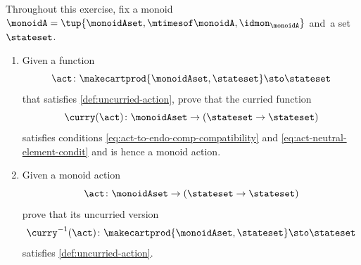 \begin{gradedexercise}
    \label{ex:UncurriedAction}
Throughout this exercise, fix a monoid $\monoidA = \tup{\monoidAset, \mtimesof\monoidA, \idmon_\monoidA}$ and~a set $\stateset$. 
\begin{enumerate}
\item Given a function
    \begin{equation}
    \act \colon \makecartprod{\monoidAset, \stateset} \sto \stateset
    \end{equation}
    that satisfies \cref{def:uncurried-action}, prove that the curried function
    \begin{equation}
    \curry(\act) \colon  \monoidAset \to (\stateset \to \stateset)
    \end{equation}
    satisfies conditions \cref{eq:act-to-endo-comp-compatibility} and \cref{eq:act-neutral-element-condit} and is hence a monoid action. 
    \item Given a monoid action 
    \begin{equation}
    \act \colon  \monoidAset \to (\stateset \to \stateset)
    \end{equation}
    prove that its uncurried version 
    \begin{equation}
    \curry^{-1}(\act) \colon  \makecartprod{\monoidAset, \stateset} \sto \stateset
    \end{equation}
    satisfies \cref{def:uncurried-action}. 
\end{enumerate}
\end{gradedexercise}

